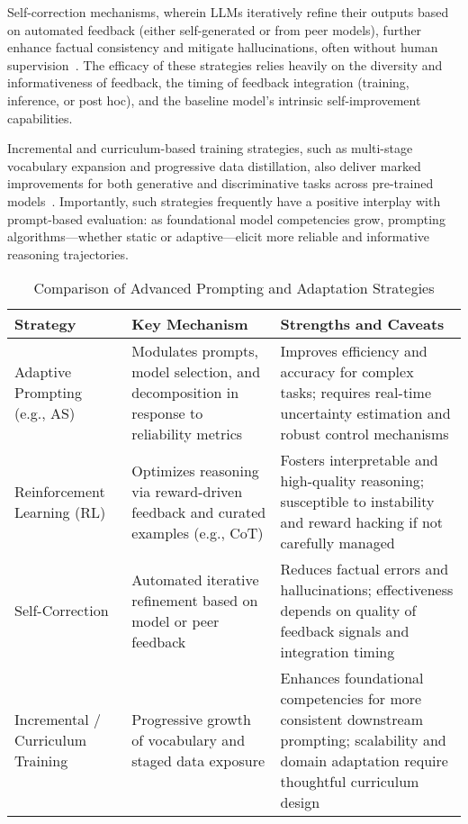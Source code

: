 \documentclass[sigconf]{acmart}
\begin{document}
Self-correction mechanisms, wherein LLMs iteratively refine their outputs based on automated feedback (either self-generated or from peer models), further enhance factual consistency and mitigate hallucinations, often without human supervision~\cite{ref68}. The efficacy of these strategies relies heavily on the diversity and informativeness of feedback, the timing of feedback integration (training, inference, or post hoc), and the baseline model's intrinsic self-improvement capabilities.

Incremental and curriculum-based training strategies, such as multi-stage vocabulary expansion and progressive data distillation, also deliver marked improvements for both generative and discriminative tasks across pre-trained models~\cite{ref49}. Importantly, such strategies frequently have a positive interplay with prompt-based evaluation: as foundational model competencies grow, prompting algorithms---whether static or adaptive---elicit more reliable and informative reasoning trajectories.

\begin{table*}[htbp]
\centering
\caption{Comparison of Advanced Prompting and Adaptation Strategies}
\label{tab:prompt_adaptation_comparison}
\begin{adjustbox}{max width=\textwidth}
\begin{tabular}{lll}
\toprule
\textbf{Strategy} & \textbf{Key Mechanism} & \textbf{Strengths and Caveats} \\
\midrule
Adaptive Prompting (e.g., AS) & Modulates prompts, model selection, and decomposition in response to reliability metrics & Improves efficiency and accuracy for complex tasks; requires real-time uncertainty estimation and robust control mechanisms \\
Reinforcement Learning (RL) & Optimizes reasoning via reward-driven feedback and curated examples (e.g., CoT) & Fosters interpretable and high-quality reasoning; susceptible to instability and reward hacking if not carefully managed \\
Self-Correction & Automated iterative refinement based on model or peer feedback & Reduces factual errors and hallucinations; effectiveness depends on quality of feedback signals and integration timing \\
Incremental / Curriculum Training & Progressive growth of vocabulary and staged data exposure & Enhances foundational competencies for more consistent downstream prompting; scalability and domain adaptation require thoughtful curriculum design \\
\bottomrule
\end{tabular}
\end{adjustbox}
\end{table*}
\end{document}
